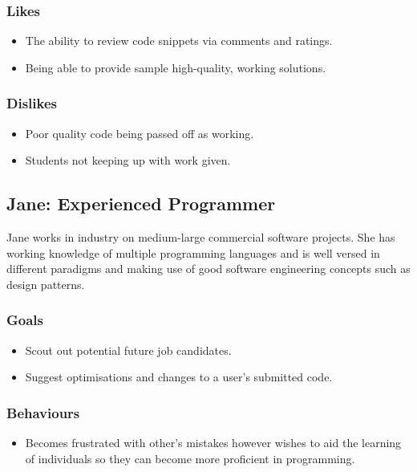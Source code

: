 \documentclass[11pt,a4paper]{article}
\begin{document}
\subsubsection{Likes}

\begin{itemize}
\item The ability to review code snippets via comments and ratings.
\item Being able to provide sample high-quality, working solutions.
\end{itemize}

\subsubsection{Dislikes}

\begin{itemize}
\item Poor quality code being passed off as working.
\item Students not keeping up with work given.
\end{itemize}

\newpage

\subsection{Jane: Experienced Programmer}

Jane works in industry on medium-large commercial software projects. She has 
working knowledge of multiple programming languages and is well versed in 
different paradigms and making use of good software engineering concepts such as 
design patterns.

\subsubsection{Goals}

\begin{itemize}
\item Scout out potential future job candidates.
\item Suggest optimisations and changes to a user's submitted code.
\end{itemize}

\subsubsection{Behaviours}

\begin{itemize}
\item Becomes frustrated with other's mistakes however wishes to aid the
learning of individuals so they can become more proficient in programming.
\end{itemize}
\end{document}
